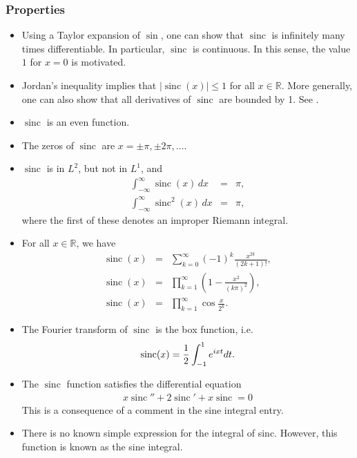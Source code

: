\documentclass[12pt]{article}
\newcommand{\sR}[0]{\mathbb{R}}
\begin{document}
\subsubsection*{Properties}
\begin{itemize}
\item Using a Taylor expansion of $\sin$, one can show that $\operatorname{sinc}$
is infinitely many times differentiable.
In particular, $\operatorname{sinc}$ is continuous. In this sense, the value $1$
for $x=0$ is motivated. 
\item Jordan's inequality implies that $|\operatorname{sinc}(x)|\le 1$ for all $x\in \sR$.  More generally, one can also show that all derivatives of $\operatorname{sinc}$ are bounded by 1.  See .
\item $\operatorname{sinc}$ is an even function.
\item The zeros of $\operatorname{sinc}$ are $x=\pm \pi, \pm 2\pi,\ldots$.
\item $\operatorname{sinc}$ is in $L^2$, but not in $L^1$, and \cite{gearhart}
\begin{eqnarray*}
\int_{-\infty}^\infty \operatorname{sinc}(x)\,dx &=& \pi,\\
\int_{-\infty}^\infty \operatorname{sinc}^2(x)\,dx &=& \pi,
\end{eqnarray*}
where the first of these denotes an improper Riemann integral.
\item For all $x\in \sR$, we have \cite{gearhart}
\begin{eqnarray*}
\operatorname{sinc} (x) &=& \sum_{k=0}^\infty (-1)^k \frac{x^{2k}}{(2k+1)!}, \\
\operatorname{sinc} (x) &=& \prod_{k=1}^\infty \left(1-\frac{x^2}{(k\pi)^2}\right), \\
\operatorname{sinc} (x) &=& \prod_{k=1}^\infty \cos \frac{x}{2^k}.
\end{eqnarray*}
\item The Fourier transform of $\operatorname{sinc}$ is the box function, i.e.
\begin{align*}
\operatorname{sinc}(x) = {1\over 2} \int_{-1}^1 e^{ixt} dt.
\end{align*}
\item The $\operatorname{sinc}$ function satisfies the differential equation
\begin{align*}
 x \operatorname{sinc}'' + 2 \operatorname{sinc}' + x \operatorname{sinc} = 0
\end{align*}
This is a consequence of a comment in the sine integral entry.
\item There is no known simple expression for the integral of
sinc. However, this function is known as the sine integral. 
\end{itemize}
\end{document}
